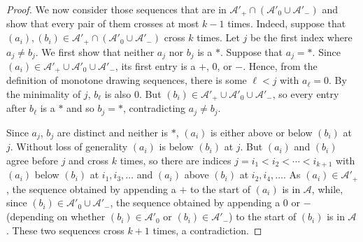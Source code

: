 \documentclass[10pt,a4paper]{amsart}
\renewcommand{\AA}{\mathcal{A}}
\begin{document}
\begin{proof}
    We now consider those sequences that are in $\AA'_{+} \cap (\AA'_{0} \cup \AA'_{-})$ and show that every pair of them crosses at most $k - 1$ times. Indeed, suppose that $(a_i), (b_i) \in \AA'_{+} \cap (\AA'_{0} \cup \AA'_{-})$ cross $k$ times. Let $j$ be the first index where $a_j \neq b_j$.  We first show that neither $a_j$ nor $b_j$ is a $\ast$. Suppose that $a_j = \ast$. Since $(a_i) \in \AA'_{+} \cup \AA'_{0} \cup \AA'_{-}$, its first entry is a $+$, $0$, or $-$. Hence, from the definition of monotone drawing sequences, there is some $\ell < j$ with $a_\ell = 0$. By the minimality of $j$, $b_\ell$ is also $0$. But $(b_i) \in \AA'_{+} \cup \AA'_{0} \cup \AA'_{-}$, so every entry after $b_\ell$ is a $\ast$ and so $b_j = \ast$, contradicting $a_j \neq b_j$. 

    Since $a_j$, $b_j$ are distinct and neither is $\ast$, $(a_i)$ is either above or below $(b_i)$ at $j$. Without loss of generality $(a_i)$ is below $(b_i)$ at $j$. But $(a_i)$ and $(b_i)$ agree before $j$ and cross $k$ times, so there are indices $j = i_1 < i_2 < \dotsb < i_{k + 1}$ with $(a_i)$ below $(b_i)$ at $i_1, i_3, \dotsc$ and $(a_i)$ above $(b_i)$ at $i_2, i_4, \dotsc$. As $(a_i) \in \AA'_{+}$, the sequence obtained by appending a $+$ to the start of $(a_i)$ is in $\AA$, while, since $(b_i) \in \AA'_{0} \cup \AA'_{-}$, the sequence obtained by appending a $0$ or $-$ (depending on whether $(b_i) \in \AA'_{0}$ or $(b_i) \in \AA'_{-}$) to the start of $(b_i)$ is in $\AA$. These two sequences cross $k + 1$ times, a contradiction.


\end{proof}
\end{document}
